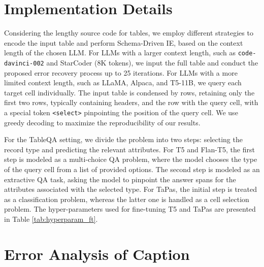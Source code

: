 \documentclass[11pt]{article}
\begin{document}
{\section{Implementation Details}
\label{sec:implement_details}

Considering the lengthy source code for tables, we employ different strategies to encode the input table and perform Schema-Driven IE, based on the context length of the chosen LLM. For LLMs with a larger context length, such as \texttt{code-davinci-002} and StarCoder (8K tokens), we input the full table and conduct the proposed error recovery process up to 25 iterations. 
For LLMs with a more limited context length, such as LLaMA, Alpaca, and T5-11B, we query each target cell individually. The input table is condensed by rows, retaining only the first two rows, typically containing headers, and the row with the query cell, with a special token \texttt{<select>} pinpointing the position of the query cell. We use greedy decoding to maximize the reproducibility of our results.

For the TableQA setting, we divide the problem into two steps: selecting the record type and predicting the relevant attributes. For T5 and Flan-T5, the first step is modeled as a multi-choice QA problem, where the model chooses the type of the query cell from a list of provided options. The second step is modeled as an extractive QA task, asking the model to pinpoint the answer spans for the attributes associated with the selected type. For TaPas, the initial step is treated as a classification problem, whereas the latter one is handled as a cell selection problem. The hyper-parameters used for fine-tuning T5 and TaPas are presented in Table \ref{tab:hyperparam_ft}.

\begin{table}[t]
\centering
{}
\caption{Hyper-parameters used for fine-tuning T5 and TaPas.
}
\label{tab:hyperparam_ft}
\end{table}


\section{Error Analysis of Caption}
\label{sec:error_analysis_of_caption}

}
\end{document}
